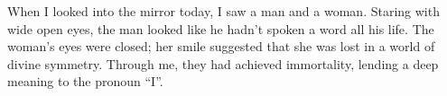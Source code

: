 \documentclass{article}
\begin{document}
When I looked into the mirror today, I saw a man and a woman. Staring
with wide open eyes, the man looked like he hadn't spoken a word all his
life. The woman's eyes were closed; her smile suggested that she was
lost in a world of divine symmetry. Through me, they had achieved
immortality, lending a deep meaning to the pronoun ``I''. 
\end{document}
